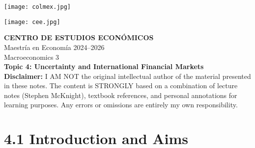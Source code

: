 \documentclass[12pt]{article}
\title{}
\author{}
\date{}
\begin{document}
\begin{titlepage}
    \vspace*{-1cm}
    \noindent
    \begin{minipage}[t]{0.49\textwidth}
        \texttt{[image: colmex.jpg]}
    \end{minipage}%
    \begin{minipage}[t]{0.49\textwidth}
        \raggedleft
        \texttt{[image: cee.jpg]}
    \end{minipage}

    \vspace*{2cm}

    \begin{center}
        \Huge \textbf{CENTRO DE ESTUDIOS ECONÓMICOS} \\[1.5em]
        \Large Maestría en Economía 2024--2026 \\[2em]
        \Large Macroeconomics 3 \\[3em]
        \LARGE \textbf{Topic 4: Uncertainty and International Financial
Markets
} \\[6em]
        \large \textbf{Disclaimer:} I AM NOT the original intellectual author of the material presented in these notes. The content is STRONGLY based on a combination of lecture notes (Stephen McKnight), textbook references, and personal annotations for learning purposes. Any errors or omissions are entirely my own responsibility.\\[0.9em]
        
    \end{center}

    \vfill
\end{titlepage}

\newpage

\setcounter{secnumdepth}{2}
\setcounter{tocdepth}{3}
\tableofcontents

\newpage

\section*{\noindent\textbf{4.1 Introduction and Aims}}
\end{document}
